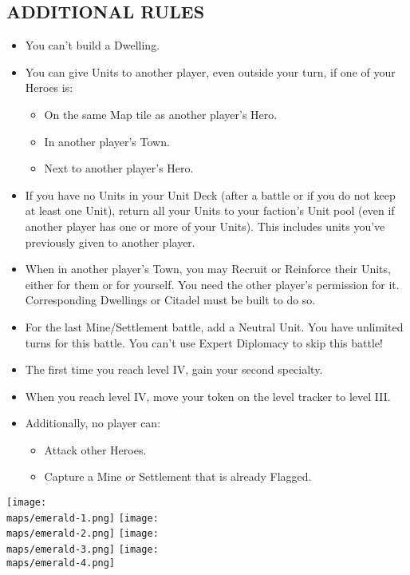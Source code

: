 \begin{multicols*}{2}
\subsection*{\MakeUppercase{Additional Rules}}
\begin{itemize}
    \item You can't build a  Dwelling.
    \item You can give Units to another player, even outside your turn, if one of your Heroes is:
    \begin{itemize}
        \item On the same Map tile as another player's Hero.
        \item In another player's Town.
        \item Next to another player's Hero.
    \end{itemize}
    \item If you have no Units in your Unit Deck (after a battle or if you do not keep at least one Unit), return all your Units to your faction's Unit pool (even if another player has one or more of your Units). This includes units you've previously given to another player.
    \item When in another player's Town, you may Recruit or Reinforce their Units, either for them or for yourself. You need the other player's permission for it. Corresponding Dwellings or Citadel must be built to do so.
    \item For the last Mine/Settlement battle, add a  Neutral Unit. You have unlimited turns for this battle. You can't use Expert Diplomacy to skip this battle!
    \item The first time you reach level IV, gain your second specialty.
    \item When you reach level IV, move your token on the level tracker to level III.
    \item Additionally, no player can:
    \begin{itemize}
        \item Attack other Heroes.
        \item Capture a Mine or Settlement that is already Flagged.
    \end{itemize}
\end{itemize}

\vspace{2em}

\begin{center}
  \texttt{[image: \\maps/emerald-1.png]}
  \vspace{3em}
  \texttt{[image: \\maps/emerald-2.png]}
  \vspace{3em}
  \texttt{[image: \\maps/emerald-3.png]}
  \vspace{3em}
  \texttt{[image: \\maps/emerald-4.png]}
\end{center}

\end{multicols*}
